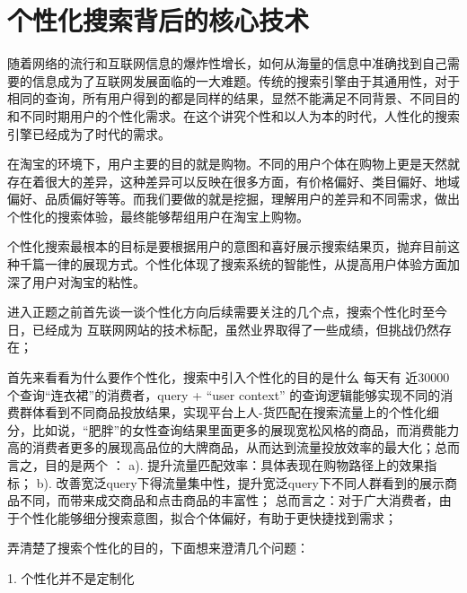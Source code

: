 
\chapter{个性化搜索背后的核心技术}
\thispagestyle{empty}

\setlength{\fboxrule}{0pt}\setlength{\fboxsep}{0cm}
\noindent\shadowbox{
\begin{tcolorbox}[arc=0mm,colback=lightblue,colframe=darkblue,title=学习目标与要求]

\end{tcolorbox}}
\setlength{\fboxrule}{1pt}\setlength{\fboxsep}{4pt} 

 随着网络的流行和互联网信息的爆炸性增长，如何从海量的信息中准确找到自己需要的信息成为了互联网发展面临的一大难题。传统的搜索引擎由于其通用性，对于相同的查询，所有用户得到的都是同样的结果，显然不能满足不同背景、不同目的和不同时期用户的个性化需求。在这个讲究个性和以人为本的时代，人性化的搜索引擎已经成为了时代的需求。

在淘宝的环境下，用户主要的目的就是购物。不同的用户个体在购物上更是天然就存在着很大的差异，这种差异可以反映在很多方面，有价格偏好、类目偏好、地域偏好、品质偏好等等。而我们要做的就是挖掘，理解用户的差异和不同需求，做出个性化的搜索体验，最终能够帮组用户在淘宝上购物。

个性化搜索最根本的目标是要根据用户的意图和喜好展示搜索结果页，抛弃目前这种千篇一律的展现方式。个性化体现了搜索系统的智能性，从提高用户体验方面加深了用户对淘宝的粘性。

进入正题之前首先谈一谈个性化方向后续需要关注的几个点，搜索个性化时至今日，已经成为
互联网网站的技术标配，虽然业界取得了一些成绩，但挑战仍然存在；

首先来看看为什么要作个性化，搜索中引入个性化的目的是什么
每天有 近30000个查询“连衣裙”的消费者，query + “user context” 的查询逻辑能够实现不同的消费群体看到不同商品投放结果，实现平台上人-货匹配在搜索流量上的个性化细分，比如说，“肥胖”的女性查询结果里面更多的展现宽松风格的商品，而消费能力高的消费者更多的展现高品位的大牌商品，从而达到流量投放效率的最大化；总而言之，目的是两个 ： 
a). 提升流量匹配效率：具体表现在购物路径上的效果指标；
b). 改善宽泛query下得流量集中性，提升宽泛query下不同人群看到的展示商品不同，而带来成交商品和点击商品的丰富性；
总而言之：对于广大消费者，由于个性化能够细分搜索意图，拟合个体偏好，有助于更快捷找到需求；

弄清楚了搜索个性化的目的，下面想来澄清几个问题：

1. 个性化并不是定制化

